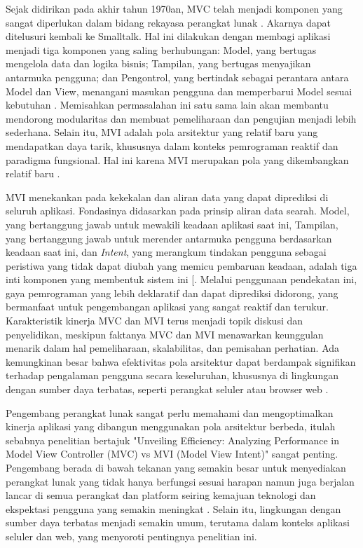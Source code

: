 \documentclass[conference]{IEEEtran}
\begin{document}
Sejak didirikan pada akhir tahun 1970an, MVC telah menjadi komponen yang sangat diperlukan dalam bidang rekayasa perangkat lunak \cite{Hidayat_Surarso_2012}. Akarnya dapat ditelusuri kembali ke Smalltalk. Hal ini dilakukan dengan membagi aplikasi menjadi tiga komponen yang saling berhubungan: Model, yang bertugas mengelola data dan logika bisnis; Tampilan, yang bertugas menyajikan antarmuka pengguna; dan Pengontrol, yang bertindak sebagai perantara antara Model dan View, menangani masukan pengguna dan memperbarui Model sesuai kebutuhan \cite{Chauhan_Kumar_Sethia_Alam_2021}. Memisahkan permasalahan ini satu sama lain akan membantu mendorong modularitas dan membuat pemeliharaan dan pengujian menjadi lebih sederhana. Selain itu, MVI adalah pola arsitektur yang relatif baru yang mendapatkan daya tarik, khususnya dalam konteks pemrograman reaktif dan paradigma fungsional. Hal ini karena MVI merupakan pola yang dikembangkan relatif baru \cite{Mezzalira_2018}. 

MVI menekankan pada kekekalan dan aliran data yang dapat diprediksi di seluruh aplikasi. Fondasinya didasarkan pada prinsip aliran data searah. Model, yang bertanggung jawab untuk mewakili keadaan aplikasi saat ini, Tampilan, yang bertanggung jawab untuk merender antarmuka pengguna berdasarkan keadaan saat ini, dan \textit{Intent}, yang merangkum tindakan pengguna sebagai peristiwa yang tidak dapat diubah yang memicu pembaruan keadaan, adalah tiga inti komponen yang membentuk sistem ini [\cite{Gunawan_Lawi_Adnan_2016}. Melalui penggunaan pendekatan ini, gaya pemrograman yang lebih deklaratif dan dapat diprediksi didorong, yang bermanfaat untuk pengembangan aplikasi yang sangat reaktif dan terukur. Karakteristik kinerja MVC dan MVI terus menjadi topik diskusi dan penyelidikan, meskipun faktanya MVC dan MVI menawarkan keunggulan menarik dalam hal pemeliharaan, skalabilitas, dan pemisahan perhatian. Ada kemungkinan besar bahwa efektivitas pola arsitektur dapat berdampak signifikan terhadap pengalaman pengguna secara keseluruhan, khususnya di lingkungan dengan sumber daya terbatas, seperti perangkat seluler atau browser web \cite{Deacon_2009}. 

Pengembang perangkat lunak sangat perlu memahami dan mengoptimalkan kinerja aplikasi yang dibangun menggunakan pola arsitektur berbeda, itulah sebabnya penelitian bertajuk "Unveiling Efficiency: Analyzing Performance in Model View Controller (MVC) vs MVI (Model View Intent)" sangat penting. Pengembang berada di bawah tekanan yang semakin besar untuk menyediakan perangkat lunak yang tidak hanya berfungsi sesuai harapan namun juga berjalan lancar di semua perangkat dan platform seiring kemajuan teknologi dan ekspektasi pengguna yang semakin meningkat \cite{Khotimah_2016}. Selain itu, lingkungan dengan sumber daya terbatas menjadi semakin umum, terutama dalam konteks aplikasi seluler dan web, yang menyoroti pentingnya penelitian ini. 
\end{document}
